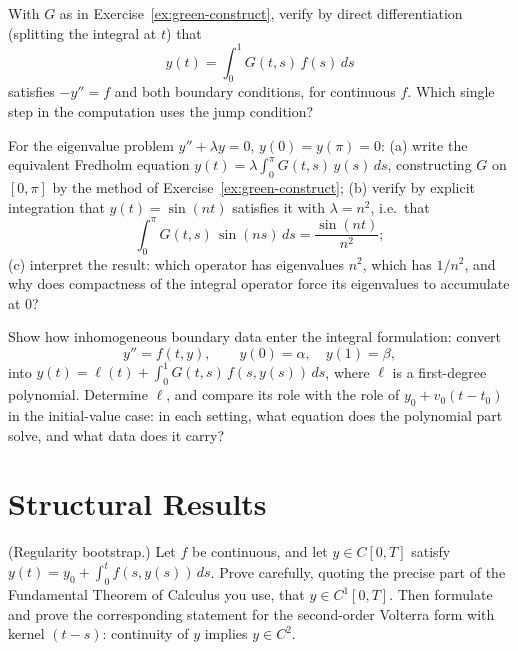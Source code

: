 \documentclass{essay}
\begin{document}
\begin{exercise}\label{ex:green-verify}
With $G$ as in Exercise~\ref{ex:green-construct}, verify by direct differentiation (splitting the integral at $t$) that
\[
y(t) = \int_0^1 G(t,s)\, f(s)\, ds
\]
satisfies $-y'' = f$ and both boundary conditions, for continuous $f$. Which single step in the computation uses the jump condition?
\end{exercise}

\begin{exercise}\label{ex:eigen}
For the eigenvalue problem $y'' + \lambda y = 0$, $y(0) = y(\pi) = 0$: (a) write the equivalent Fredholm equation $y(t) = \lambda \int_0^\pi G(t,s)\, y(s)\, ds$, constructing $G$ on $[0,\pi]$ by the method of Exercise~\ref{ex:green-construct}; (b) verify by explicit integration that $y(t) = \sin(nt)$ satisfies it with $\lambda = n^2$, i.e.\ that
\[
\int_0^\pi G(t,s)\,\sin(ns)\, ds = \frac{\sin(nt)}{n^2};
\]
(c) interpret the result: which operator has eigenvalues $n^2$, which has $1/n^2$, and why does compactness of the integral operator force its eigenvalues to accumulate at $0$?
\end{exercise}

\begin{exercise}\label{ex:inhomog-bc}
Show how inhomogeneous boundary data enter the integral formulation: convert
\[
y'' = f(t, y), \qquad y(0) = \alpha, \quad y(1) = \beta,
\]
into $y(t) = \ell(t) + \int_0^1 G(t,s)\, f(s, y(s))\, ds$, where $\ell$ is a first-degree polynomial. Determine $\ell$, and compare its role with the role of $y_0 + v_0(t - t_0)$ in the initial-value case: in each setting, what equation does the polynomial part solve, and what data does it carry?
\end{exercise}

\section{Structural Results}

\begin{exercise}\label{ex:bootstrap}
(Regularity bootstrap.) Let $f$ be continuous, and let $y \in C[0, T]$ satisfy $y(t) = y_0 + \int_0^t f(s, y(s))\,ds$. Prove carefully, quoting the precise part of the Fundamental Theorem of Calculus you use, that $y \in C^1[0,T]$. Then formulate and prove the corresponding statement for the second-order Volterra form with kernel $(t - s)$: continuity of $y$ implies $y \in C^2$.
\end{exercise}
\end{document}
